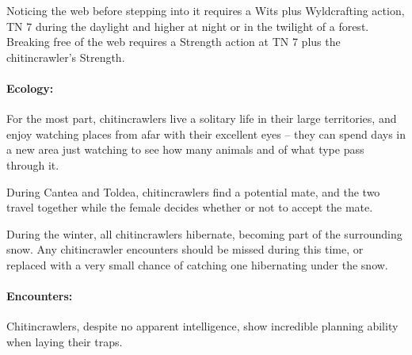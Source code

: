 \begin{multicols}{2}
Noticing the web before stepping into it requires a Wits plus Wyldcrafting action, TN 7 during the daylight and higher at night or in the twilight of a forest.
Breaking free of the web requires a Strength action at TN 7 plus the chitincrawler's Strength.

\paragraph{Ecology:}
For the most part, chitincrawlers live a solitary life in their large territories, and enjoy watching places from afar with their excellent eyes -- they can spend days in a new area just watching to see how many animals and of what type pass through it.

During Cantea and Toldea, chitincrawlers find a potential mate, and the two travel together while the female decides whether or not to accept the mate.

During the winter, all chitincrawlers hibernate, becoming part of the surrounding snow.
Any chitincrawler encounters should be missed during this time, or replaced with a very small chance of catching one hibernating under the snow.

\paragraph{Encounters:} Chitincrawlers, despite no apparent intelligence, show incredible planning ability when laying their traps.

\begin{itemize}


\end{itemize}
\end{multicols}
